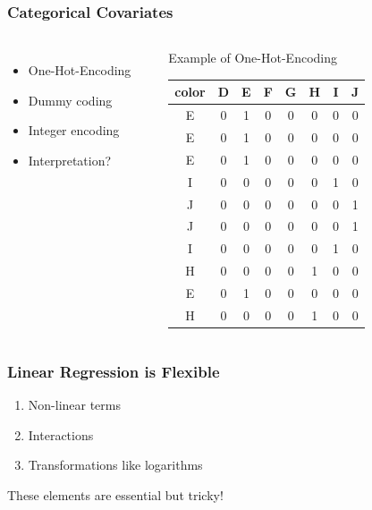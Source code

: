\documentclass[
    utf8,
    aspectratio=169
]{beamer}  %
\begin{document}
\begin{frame}
\frametitle{Categorical Covariates}
\begin{columns}[onlytextwidth]
	\begin{itemize}
		\item One-Hot-Encoding
		\item Dummy coding
		\item Integer encoding
		\item Interpretation?
	\end{itemize}
	\vspace{1cm}
	\begin{example}
	\end{example}
	\begin{block}{Example of One-Hot-Encoding}
	\begin{table}
	\begin{tabular}{cccccccc}
		\hline
		   color& D& E& F &G&H &I &J \\
  		\hline
		E  &   0  &   1  &   0  &   0  &   0  &   0  &   0 \\
		E  &   0  &   1  &   0  &   0  &   0  &   0  &   0 \\
		E  &   0  &   1  &   0  &   0  &   0  &   0  &   0 \\
		I  &   0  &   0  &   0  &   0  &   0  &   1  &   0 \\
		J  &   0  &   0  &   0  &   0  &   0  &   0  &   1 \\
		J  &   0  &   0  &   0  &   0  &   0  &   0  &   1 \\
		I  &   0  &   0  &   0  &   0  &   0  &   1  &   0 \\
		H  &   0  &   0  &   0  &   0  &   1  &   0  &   0 \\
		E  &   0  &   1  &   0  &   0  &   0  &   0  &   0 \\
		H  &   0  &   0  &   0  &   0  &   1  &   0  &   0 \\
     	\hline
	\end{tabular}
\end{table}
	\end{block}
	\end{columns}
\end{frame}

\begin{frame}
\frametitle{Linear Regression is Flexible}
\begin{enumerate}
	\item Non-linear terms
	\item Interactions
	\item Transformations like logarithms
\end{enumerate}

\vfill

\begin{block}{These elements are essential but tricky!}
\end{block}
\end{frame}
\end{document}
